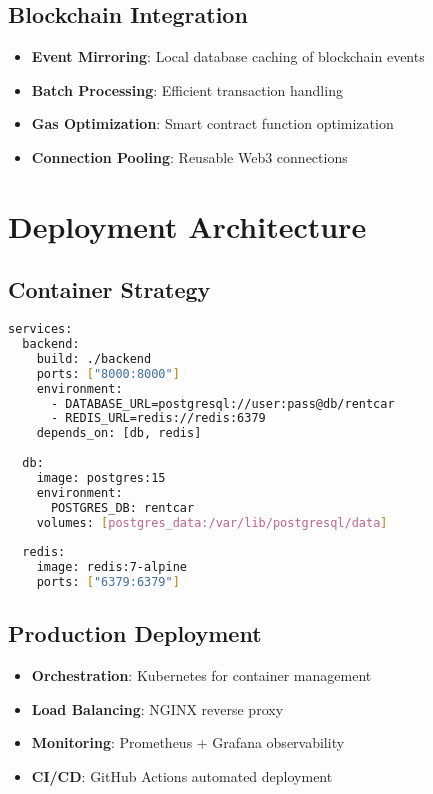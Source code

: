 \documentclass[11pt,a4paper]{article}
\begin{document}
\subsection{Blockchain Integration}
\begin{itemize}
    \item \textbf{Event Mirroring}: Local database caching of blockchain events
    \item \textbf{Batch Processing}: Efficient transaction handling
    \item \textbf{Gas Optimization}: Smart contract function optimization
    \item \textbf{Connection Pooling}: Reusable Web3 connections
\end{itemize}

\section{Deployment Architecture}

\subsection{Container Strategy}
\begin{lstlisting}[language=bash, caption=Docker Compose Setup]
services:
  backend:
    build: ./backend
    ports: ["8000:8000"]
    environment:
      - DATABASE_URL=postgresql://user:pass@db/rentcar
      - REDIS_URL=redis://redis:6379
    depends_on: [db, redis]
  
  db:
    image: postgres:15
    environment:
      POSTGRES_DB: rentcar
    volumes: [postgres_data:/var/lib/postgresql/data]
  
  redis:
    image: redis:7-alpine
    ports: ["6379:6379"]
\end{lstlisting}

\subsection{Production Deployment}
\begin{itemize}
    \item \textbf{Orchestration}: Kubernetes for container management
    \item \textbf{Load Balancing}: NGINX reverse proxy
    \item \textbf{Monitoring}: Prometheus + Grafana observability
    \item \textbf{CI/CD}: GitHub Actions automated deployment
\end{itemize}
\end{document}
